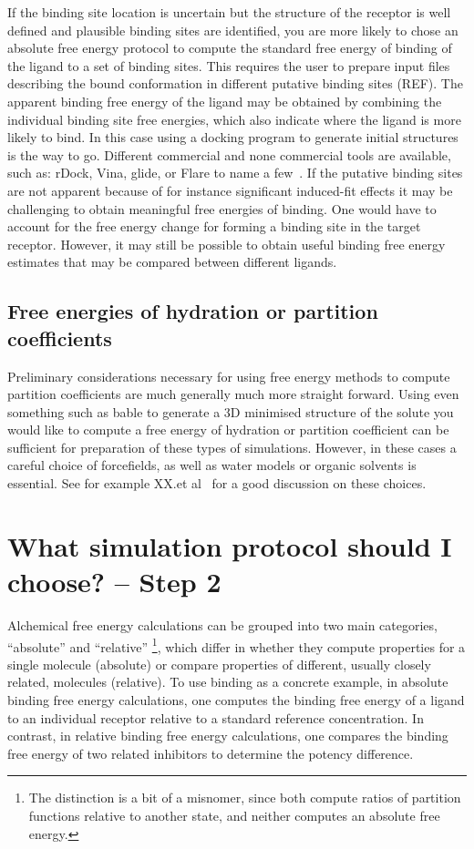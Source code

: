 \documentclass[9pt,bestpractices]{livecoms}
\begin{document}
If the binding site location is uncertain but the structure of the receptor is well defined and plausible binding sites are identified, you are more likely to chose an absolute free energy protocol to compute the standard free energy of binding of the ligand to a set of binding sites. This requires the user to prepare input files describing the bound conformation in different putative binding sites (REF). The apparent binding free energy of the ligand may be obtained by combining the individual binding site free energies, which also indicate where the ligand is more likely to bind. In this case using a docking program to generate initial structures is the way to go. Different commercial and none commercial tools are available, such as: rDock, Vina, glide, or Flare to name a few~\cite{rDock, Vina, Glide, Flare}. 
If the putative binding sites are not apparent because of for instance significant induced-fit effects it may be challenging to obtain meaningful free energies of binding. One would have to account for the free energy change for forming a binding site in the target receptor. However, it may still be possible to obtain useful binding free energy estimates that may be compared between different ligands.  

\subsection*{Free energies of hydration or partition coefficients}
Preliminary considerations necessary for using free energy methods to compute partition coefficients are much generally much more straight forward. Using even something such as bable to generate a 3D minimised structure of the solute you would like to compute a free energy of hydration or partition coefficient can be sufficient for preparation of these types of simulations. However, in these cases a careful choice of forcefields, as well as water models or organic solvents is essential. See for example XX.et al~\cite{xxx} for a good discussion on these choices. 
%
%
%
%
\section{What simulation protocol should I choose? -- Step 2}
\label{sec:step2}
Alchemical free energy calculations can be grouped into two main categories, ``absolute'' and ``relative'' \footnote{The distinction is a bit of a misnomer, since both compute ratios of partition functions relative to another state, and neither computes an absolute free energy.}, which differ in whether they compute properties for a single molecule (absolute) or compare properties of different, usually closely related, molecules (relative).
To use binding as a concrete example, in absolute binding free energy calculations, one computes the binding free energy of a ligand to an individual receptor relative to a standard reference concentration.
In contrast, in relative binding free energy calculations, one compares the binding free energy of two related inhibitors to determine the potency difference.
\end{document}
